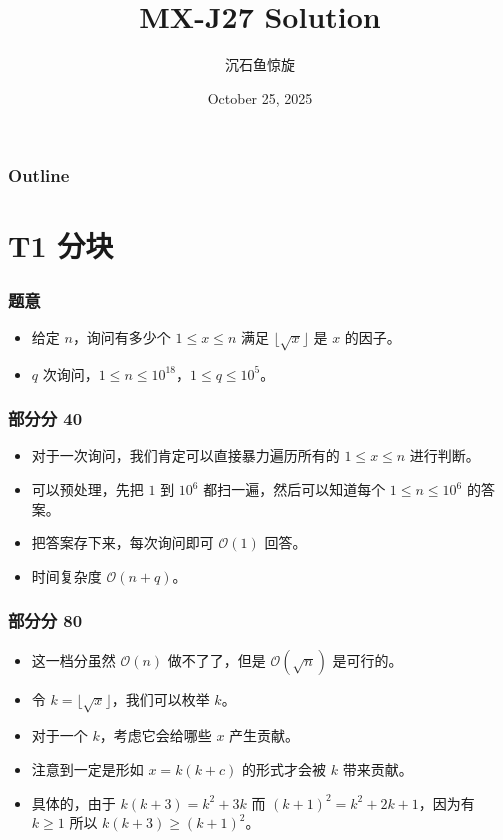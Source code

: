 \documentclass[aspectratio=169]{ctexbeamer}
\author{沉石鱼惊旋}
\title{MX-J27 Solution}
\date{October 25, 2025}
\begin{document}
\frame[plain]{\titlepage}

\begin{frame}
  \frametitle{Outline}
  \tableofcontents
\end{frame}

\section{T1 分块}


\begin{frame}
  \frametitle{题意}

  \begin{itemize}
    \item <1 - > 给定 $n$，询问有多少个 $1\leq x\leq n$ 满足 $\lfloor\sqrt{x}\rfloor$ 是 $x$ 的因子。
    \item <2 - > $q$ 次询问，$1\leq n\leq 10^{18}$，$1\leq q\leq 10^5$。
  \end{itemize}

\end{frame}

\begin{frame}
  \frametitle{部分分 40}

  \begin{itemize}
    \item <1 - > 对于一次询问，我们肯定可以直接暴力遍历所有的 $1\leq x\leq n$ 进行判断。
    \item <2 - > 可以预处理，先把 $1$ 到 $10^6$ 都扫一遍，然后可以知道每个 $1\leq n\leq 10^6$ 的答案。
    \item <3 - > 把答案存下来，每次询问即可 $\mathcal O(1)$ 回答。
    \item <4 - > 时间复杂度 $\mathcal O(n+q)$。
  \end{itemize}

\end{frame}

\begin{frame}
  \frametitle{部分分 80}

  \begin{itemize}
    \item <1 - > 这一档分虽然 $\mathcal O(n)$ 做不了了，但是 $\mathcal O(\sqrt n)$ 是可行的。
    \item <2 - > 令 $k=\lfloor\sqrt{x}\rfloor$，我们可以枚举 $k$。
    \item <3 - > 对于一个 $k$，考虑它会给哪些 $x$ 产生贡献。
    \item <4 - > 注意到一定是形如 $x=k(k+c)$ 的形式才会被 $k$ 带来贡献。
    \item <5 - > 具体的，由于 $k(k+3)=k^2+3k$ 而 $(k+1)^2=k^2+2k+1$，因为有 $k\geq 1$ 所以 $k(k+3)\geq (k+1)^2$。
  \end{itemize}

\end{frame}
\end{document}
